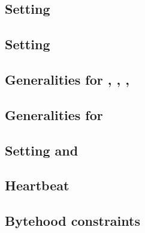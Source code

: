 \subsection{Setting \accInputs{}}                                           \label{bls data: setting acc pairings}                               
\subsection{Setting \internalChecksPassed{}}                                \label{bls data: setting internal checks have passed}                

\subsection{Generalities for \cOneMembershipTestRequired{}, \cTwoMembershipTestRequired{}, \gOneMembershipTestRequired{}, \gTwoMembershipTestRequired{}}                     \label{bls: generalities for membership test}                        

\subsection{Generalities for \acceptablePairOfPoints{}}                     \label{bls data: generalities for acceptable pairs of points}        

\subsection{Setting \trivialAllInf{} and \trivialWithMembershipCheck{}}                                      \label{bls: setting trivial pairing}                                 

\subsection{Heartbeat}                                                      \label{bls data: heartbeat}                                          
\subsection{Bytehood constraints}                                           \label{bls: bytehood and accumulator}                                
